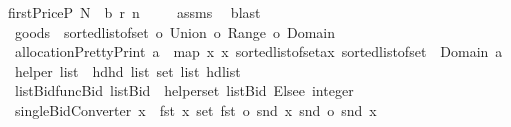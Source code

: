 \begin{isabellebody}
{\isachardoublequoteopen}firstPriceP\ N\ {\isasymOmega}\ b\ r\ n\ {\isasymge}\ {}{\isachardoublequoteclose}%
\isadelimproof
\ %
\endisadelimproof
%
\isatagproof
{}\isamarkupfalse%
\ assms\ \isamarkupfalse%
\ blast%
\endisatagproof
{\isafoldproof}%
%
\isadelimproof
%
\endisadelimproof
\isanewline
\isanewline
\isanewline
\isanewline
\isanewline
\isanewline
\isanewline
{}\isamarkupfalse%
\ {\isachardoublequoteopen}goods\ {\isacharequal}{\isacharequal}\ sorted{\isacharunderscore}list{\isacharunderscore}of{\isacharunderscore}set\ o\ Union\ o\ Range\ o\ Domain{\isachardoublequoteclose}\isanewline
\isanewline
\isanewline
\isanewline
{}\isamarkupfalse%
\ {\isachardoublequoteopen}allocationPrettyPrint{}\ a\ {\isacharequal}{\isacharequal}\ map\ {\isacharparenleft}{\isacharpercent}x{\isachardot}\ {\isacharparenleft}x{\isacharcomma}\ sorted{\isacharunderscore}list{\isacharunderscore}of{\isacharunderscore}set{\isacharparenleft}a{\isacharcomma}{\isacharcomma}x{\isacharparenright}{\isacharparenright}{\isacharparenright}\ {\isacharparenleft}{\isacharparenleft}sorted{\isacharunderscore}list{\isacharunderscore}of{\isacharunderscore}set\ {\isasymcirc}\ Domain{\isacharparenright}\ a{\isacharparenright}{\isachardoublequoteclose}\isanewline
{}\isamarkupfalse%
\ {\isachardoublequoteopen}helper\ {\isacharparenleft}list{\isacharparenright}\ {\isacharequal}{\isacharequal}\ {\isacharparenleft}{\isacharparenleft}{\isacharparenleft}hd{\isasymcirc}hd{\isacharparenright}\ list{\isacharcomma}\ set\ {\isacharparenleft}list{\isacharbang}{}{\isacharparenright}{\isacharparenright}{\isacharcomma}\ hd{\isacharparenleft}list{\isacharbang}{}{\isacharparenright}{\isacharparenright}{\isachardoublequoteclose}\isanewline
{}\isamarkupfalse%
\ {\isachardoublequoteopen}listBid{}funcBid\ listBid\ {\isacharequal}\ {\isacharparenleft}helper{\isacharbackquote}{\isacharparenleft}set\ listBid{\isacharparenright}{\isacharparenright}\ Elsee\ {\isacharparenleft}{}{\isacharcolon}{\isacharcolon}integer{\isacharparenright}{\isachardoublequoteclose}\isanewline
\isanewline
{}\isamarkupfalse%
\ {\isachardoublequoteopen}singleBidConverter\ x\ {\isacharequal}{\isacharequal}\ {\isacharparenleft}{\isacharparenleft}fst\ x{\isacharcomma}\ set\ {\isacharparenleft}{\isacharparenleft}fst\ o\ snd{\isacharparenright}\ x{\isacharparenright}{\isacharparenright}{\isacharcomma}\ {\isacharparenleft}snd\ o\ snd{\isacharparenright}\ x{\isacharparenright}{\isachardoublequoteclose}\isanewline

\end{isabellebody}
